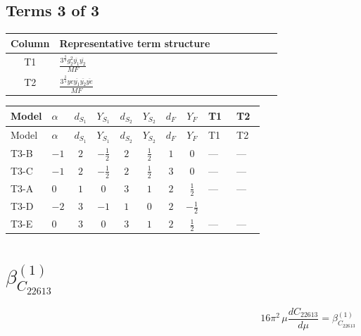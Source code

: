 \documentclass[8pt]{article}
\begin{document}
\begin{landscape}
\subsection*{Terms 3 of 3}
\begin{center}
\begin{tabular}{@{}c >{\raggedright\arraybackslash}p{0.82\linewidth}@{}}
\toprule
Column & Representative term structure \\
\midrule
T1 & \(\displaystyle \frac{3^{\frac{3}{4}} g_{2}^{2} \overline{y_{1}} \overline{y_{2}}}{MF}\) \\
\midrule
T2 & \(\displaystyle \frac{3^{\frac{3}{4}} ye \overline{y_{1}} \overline{y_{2}} \overline{ye}}{MF}\) \\
\midrule
\bottomrule
\end{tabular}
\end{center}
\smallskip
\tiny
\begin{longtable}{@{}llcccccc >{\raggedright\arraybackslash}p{0.21\linewidth} >{\raggedright\arraybackslash}p{0.21\linewidth}@{}}
\toprule
Model & $\alpha$ & $d_{S_1}$ & $Y_{S_1}$ & $d_{S_2}$ & $Y_{S_2}$ & $d_F$ & $Y_F$ & T1 & T2 \\
\midrule
\endfirsthead
\toprule
Model & $\alpha$ & $d_{S_1}$ & $Y_{S_1}$ & $d_{S_2}$ & $Y_{S_2}$ & $d_F$ & $Y_F$ & T1 & T2 \\
\midrule
\endhead
T3-B & $-1$ & $2$ & $-\frac{1}{2}$ & $2$ & $\frac{1}{2}$ & $1$ & $0$ & --- & --- \\
\midrule
T3-C & $-1$ & $2$ & $-\frac{1}{2}$ & $2$ & $\frac{1}{2}$ & $3$ & $0$ & --- & --- \\
\midrule
T3-A & $0$ & $1$ & $0$ & $3$ & $1$ & $2$ & $\frac{1}{2}$ & --- & --- \\
\midrule
T3-D & $-2$ & $3$ & $-1$ & $1$ & $0$ & $2$ & $-\frac{1}{2}$ & \scriptsize\adjustbox{max width=\linewidth}{$\begin{gathered} \frac{11 \cdot 3^{\frac{3}{4}} g_{2}^{2} \overline{y_{1}} \overline{y_{2}}}{8 MF}\end{gathered}$} & \scriptsize\adjustbox{max width=\linewidth}{$\begin{gathered} - \frac{3^{\frac{3}{4}} ye \overline{y_{1}} \overline{y_{2}} \overline{ye}}{12 MF}\end{gathered}$} \\
\midrule
T3-E & $0$ & $3$ & $0$ & $3$ & $1$ & $2$ & $\frac{1}{2}$ & --- & --- \\
\midrule
\bottomrule
\end{longtable}
\clearpage
\section*{$\beta_{C_{22613}}^{(1)}$}
\[16\pi^2\,\mu\frac{d C_{22613}}{d\mu}=\beta_{C_{22613}}^{(1)}\]

\end{landscape}
\end{document}
